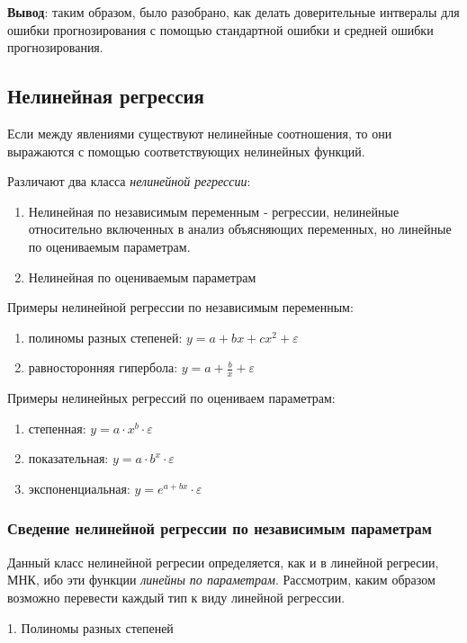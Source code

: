 \documentclass[aps,%
12pt,%
final,%
oneside,
onecolumn,%
musixtex, %
superscriptaddress,%
centertags]{article} %
\begin{document}
\textbf{Вывод}: таким образом, было разобрано, как делать доверительные интвералы для ошибки прогнозирования с помощью стандартной ошибки и средней ошибки прогнозирования.
\newpage
\subsection{Нелинейная регрессия}

Если между явлениями существуют нелинейные соотношения, то они выражаются с помощью соответствующих нелинейных функций.

Различают два класса \textit{нелинейной регрессии}:
\begin{enumerate}
	\item Нелинейная по независимым переменным - регрессии, нелинейные относительно включенных в анализ объясняющих переменных, но линейные по оцениваемым параметрам.
	\item Нелинейная по оцениваемым параметрам 
\end{enumerate}

Примеры нелинейной регрессии по независимым переменным:
\begin{enumerate}
	\item полиномы разных степеней: $ y = a + bx + cx^2+ \varepsilon $
	\item равносторонняя гипербола: $ y = a + \frac{b}{x} + \varepsilon $
\end{enumerate}

Примеры нелинейных регрессий по оцениваем параметрам:
\begin{enumerate}
	\item степенная: $ y = a \cdot x^b \cdot \varepsilon $
	\item показательная: $ y = a \cdot b^x \cdot \varepsilon $
	\item экспоненциальная: $ y =e^{a+bx} \cdot \varepsilon $ 
\end{enumerate}
\subsubsection{Сведение нелинейной регрессии по независимым параметрам}

Данный класс нелинейной регресии определяется, как и в линейной регресии, МНК, ибо эти функции \textit{линейны по параметрам}. Рассмотрим, каким образом возможно перевести каждый тип к виду линейной регрессии.

\begin{center} 1. Полиномы разных степеней \end{center}
\end{document}
